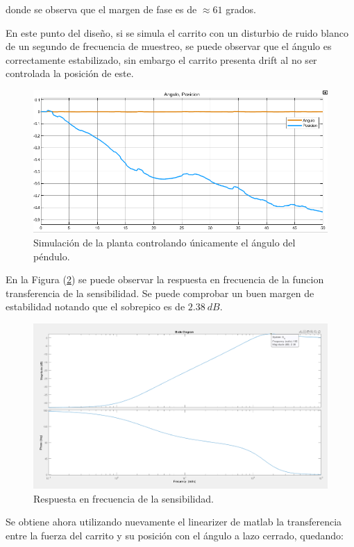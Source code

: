donde se observa que el margen de fase es de $\approx 61$ grados.

En este punto del diseño, si se simula el carrito con un disturbio de ruido blanco de un segundo de frecuencia de muestreo, se puede observar que el ángulo es correctamente estabilizado, sin embargo el carrito presenta drift al no ser controlada la posición de este.

\begin{figure}[H]
	\centering
	\includegraphics[width=0.8\linewidth]{Imagenes/loopshaping/simulacion_solo_angulo}
	\caption{Simulación de la planta controlando únicamente el ángulo del péndulo.}
	\label{simulacion_solo_angulo}
\end{figure}

En la Figura (\ref{s_q}) se puede observar la respuesta en frecuencia de la funcion transferencia de la sensibilidad. Se puede comprobar un buen margen de estabilidad notando que el sobrepico es de $2.38 \ dB$.

\begin{figure}[H]
	\centering
	\includegraphics[width=0.8\linewidth]{Imagenes/loopshaping/bode_s_q}
	\caption{Respuesta en frecuencia de la sensibilidad.}
	\label{s_q}
\end{figure}

Se obtiene ahora utilizando nuevamente el linearizer de matlab la transferencia entre la fuerza del carrito y su posición con el ángulo a lazo cerrado, quedando:

